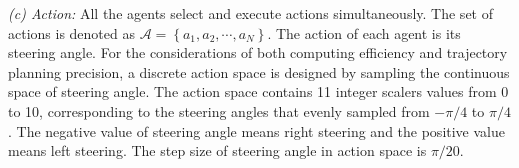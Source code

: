 \documentclass[journal]{IEEEtran}
\begin{document}
\textit{(c) Action:} All the agents select and execute actions simultaneously. The set of actions is denoted as $\mathcal{A}=\left\{a_1, a_2, \cdots, a_N\right\}$. The action of each agent is its steering angle. 
For the considerations of both computing efficiency and trajectory planning precision, a discrete action space is designed by sampling the continuous space of steering angle. The action space contains 11 integer scalers values from 0 to 10, corresponding to the steering angles that evenly sampled from $-\pi/4$ to $\pi/4$. The negative value of steering angle means right steering and the positive value means left steering. The step size of steering angle in action space is $\pi/20$. 


\end{document}
